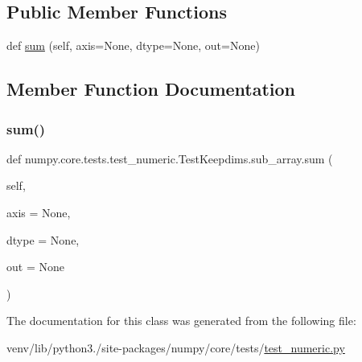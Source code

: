 \subsection*{Public Member Functions}
\begin{DoxyCompactItemize}
\item 
def \hyperlink{classnumpy_1_1core_1_1tests_1_1test__numeric_1_1TestKeepdims_1_1sub__array_aeba54d7cc3f1666f341cde08cac0e561}{sum} (self, axis=None, dtype=None, out=None)
\end{DoxyCompactItemize}


\subsection{Member Function Documentation}
\mbox{\label{classnumpy_1_1core_1_1tests_1_1test__numeric_1_1TestKeepdims_1_1sub__array_aeba54d7cc3f1666f341cde08cac0e561}} 
\subsubsection{\texorpdfstring{sum()}{sum()}}
{\footnotesize\ttfamily def numpy.\+core.\+tests.\+test\+\_\+numeric.\+Test\+Keepdims.\+sub\+\_\+array.\+sum (\begin{DoxyParamCaption}\item[{}]{self,  }\item[{}]{axis = {\ttfamily None},  }\item[{}]{dtype = {\ttfamily None},  }\item[{}]{out = {\ttfamily None} }\end{DoxyParamCaption})}



The documentation for this class was generated from the following file\+:\begin{DoxyCompactItemize}
\item 
venv/lib/python3./site-\/packages/numpy/core/tests/\hyperlink{core_2tests_2test__numeric_8py}{test\+\_\+numeric.\+py}\end{DoxyCompactItemize}
